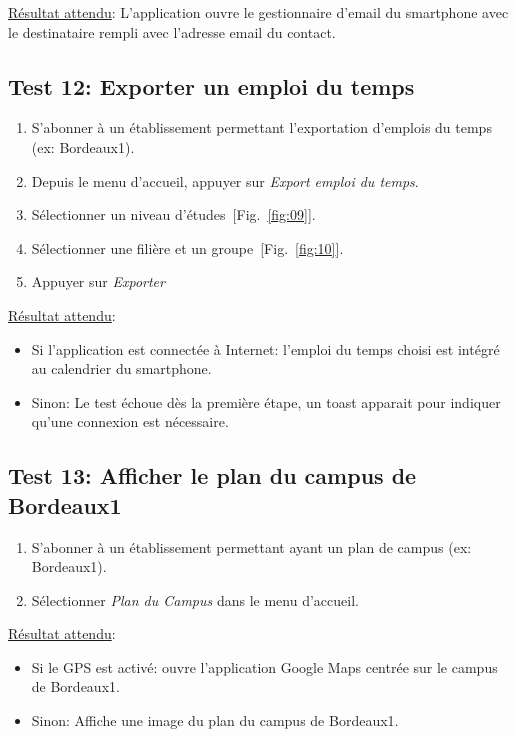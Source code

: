 \documentclass [pdftex,12pt] {report}
\begin{document}
    \underline{Résultat attendu}: L'application ouvre le gestionnaire d'email du smartphone avec le destinataire rempli avec l'adresse email du contact.

  \subsection{Test 12: Exporter un emploi du temps}
    \begin{enumerate}
    \item S'abonner à un établissement permettant l'exportation d'emplois du temps (ex: Bordeaux1).
    \item Depuis le menu d'accueil, appuyer sur \emph{Export emploi du temps}.
    \item Sélectionner un niveau d'études~[Fig.~\ref{fig:09}].
    \item Sélectionner une filière et un groupe~[Fig.~\ref{fig:10}].
    \item Appuyer sur \emph{Exporter}
    \end{enumerate}

    \underline{Résultat attendu}:
    \begin{itemize}
    \item Si l'application est connectée à Internet: l'emploi du temps choisi est intégré au calendrier du smartphone.
    \item Sinon: Le test échoue dès la première étape, un toast apparait pour indiquer qu'une connexion est nécessaire.
    \end{itemize}

  \subsection{Test 13: Afficher le plan du campus de Bordeaux1}
    \begin{enumerate}
    \item S'abonner à un établissement permettant ayant un plan de campus (ex: Bordeaux1).
    \item Sélectionner \emph{Plan du Campus} dans le menu d'accueil.
    \end{enumerate}

    \underline{Résultat attendu}:
    \begin{itemize}
    \item Si le GPS est activé: ouvre l'application Google Maps centrée sur le campus de Bordeaux1.
    \item Sinon: Affiche une image du plan du campus de Bordeaux1.
    \end{itemize}
\end{document}
